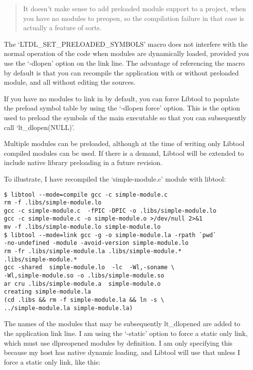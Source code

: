 \begin{quote}
It doesn't make sense to add preloaded module support to a project, when you have no modules to preopen, so the compilation failure in that case is actually a feature of sorts.
\end{quote}

The `LTDL\_{}SET\_{}PRELOADED\_{}SYMBOLS' macro does not interfere with the normal operation of the code when modules are dynamically loaded, provided you use the `-dlopen' option on the link line. The advantage of referencing the macro by default is that you can recompile the application with or without preloaded module, and all without editing the sources.

If you have no modules to link in by default, you can force Libtool to populate the preload symbol table by using the `-dlopen force' option. This is the option used to preload the symbols of the main executable so that you can subsequently call `lt\_{}dlopen(NULL)'.

Multiple modules can be preloaded, although at the time of writing only Libtool compiled modules can be used. If there is a demand, Libtool will be extended to include native library preloading in a future revision.

To illustrate, I have recompiled the `simple-module.c' module with libtool: 

\begin{Verbatim}[frame=single]
$ libtool --mode=compile gcc -c simple-module.c
rm -f .libs/simple-module.lo
gcc -c simple-module.c  -fPIC -DPIC -o .libs/simple-module.lo
gcc -c simple-module.c -o simple-module.o >/dev/null 2>&1
mv -f .libs/simple-module.lo simple-module.lo
$ libtool --mode=link gcc -g -o simple-module.la -rpath `pwd`
-no-undefined -module -avoid-version simple-module.lo
rm -fr .libs/simple-module.la .libs/simple-module.*
.libs/simple-module.*
gcc -shared  simple-module.lo  -lc  -Wl,-soname \
-Wl,simple-module.so -o .libs/simple-module.so
ar cru .libs/simple-module.a  simple-module.o
creating simple-module.la
(cd .libs && rm -f simple-module.la && ln -s \
../simple-module.la simple-module.la)
\end{Verbatim}

The names of the modules that may be subsequently lt\_{}dlopened are added to the application link line. I am using the `-static' option to force a static only link, which must use dlpreopened modules by definition. I am only specifying this because my host has native dynamic loading, and Libtool will use that unless I force a static only link, like this:

